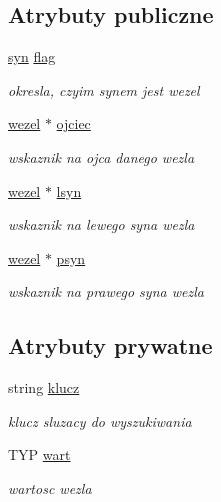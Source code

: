 \subsection*{Atrybuty publiczne}
\begin{DoxyCompactItemize}
\item 
\hyperlink{drzewo_8hh_a9bf0b5cfb3ec8e645ac2e89e92db4361}{syn} \hyperlink{classwezel_afdf37f0bdec8aad5a7bdb490ac12f6f1}{flag}
\begin{DoxyCompactList}\small\item\em okresla, czyim synem jest wezel \end{DoxyCompactList}\item 
\hyperlink{classwezel}{wezel} $\ast$ \hyperlink{classwezel_a85d0d08cd058b7ba0546c31e7cb464b0}{ojciec}
\begin{DoxyCompactList}\small\item\em wskaznik na ojca danego wezla \end{DoxyCompactList}\item 
\hyperlink{classwezel}{wezel} $\ast$ \hyperlink{classwezel_aea9a623088a96fc878c52ac35625f961}{lsyn}
\begin{DoxyCompactList}\small\item\em wskaznik na lewego syna wezla \end{DoxyCompactList}\item 
\hyperlink{classwezel}{wezel} $\ast$ \hyperlink{classwezel_ad11efeb4a2370777c00dce1ad6cd6431}{psyn}
\begin{DoxyCompactList}\small\item\em wskaznik na prawego syna wezla \end{DoxyCompactList}\end{DoxyCompactItemize}
\subsection*{Atrybuty prywatne}
\begin{DoxyCompactItemize}
\item 
string \hyperlink{classwezel_ada78704962c0e466156d3175b6cf9228}{klucz}
\begin{DoxyCompactList}\small\item\em klucz sluzacy do wyszukiwania \end{DoxyCompactList}\item 
T\-Y\-P \hyperlink{classwezel_a40046e679b18d040aaaacd2beccf7fed}{wart}
\begin{DoxyCompactList}\small\item\em wartosc wezla \end{DoxyCompactList}\end{DoxyCompactItemize}


